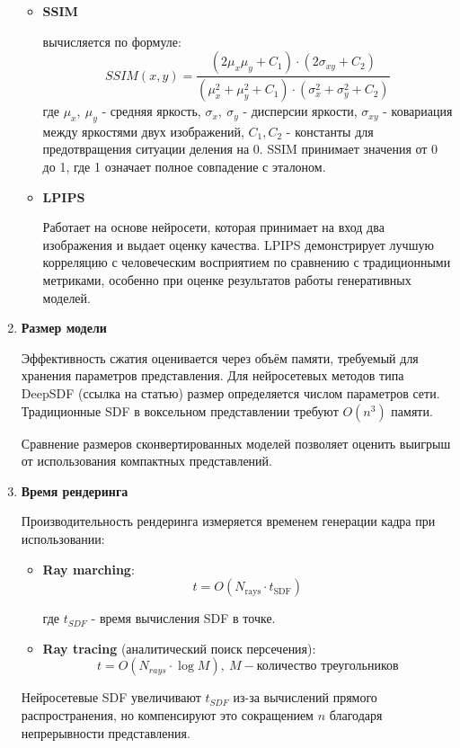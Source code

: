 \documentclass[a4paper,hidelinks,12pt]{article}
\begin{document}
\begin{enumerate}
\begin{itemize}
		\item \textbf{SSIM}
		\par
		вычисляется по формуле: $$SSIM(x, y) = \frac{(2\mu_x\mu_y + C_1) \cdot (2\sigma_{xy} + C_2)}{(\mu_x^2 + \mu_y^2 + C_1) \cdot (\sigma_x^2 + \sigma_y^2 + C_2)}$$
		где $\mu_x, \ \mu_y$ - средняя яркость, $\sigma_x, \ \sigma_y$ - дисперсии яркости, $\sigma_{xy}$ - ковариация между яркостями двух изображений, $C_1, C_2$ - константы для предотвращения ситуации деления на 0.
		SSIM принимает значения от 0 до 1, где 1 означает полное совпадение с эталоном.
		\item \textbf{LPIPS}
		\par
		Работает на основе нейросети, которая принимает на вход два изображения и выдает оценку качества. LPIPS демонстрирует лучшую корреляцию с человеческим восприятием по сравнению с традиционными 
		метриками, особенно при оценке результатов работы генеративных моделей.

	\end{itemize}

	\item \textbf{Размер модели}
	\par
	Эффективность сжатия оценивается через объём памяти, требуемый для хранения параметров представления. 
	Для нейросетевых методов типа DeepSDF (ссылка на статью) размер определяется числом параметров сети. Традиционные SDF в воксельном представлении требуют 
	$ O(n^3) $ памяти.

	Сравнение размеров сконвертированных моделей позволяет оценить выигрыш от использования компактных 
	представлений.

	\item \textbf{Время рендеринга}
	\par
	Производительность рендеринга измеряется временем генерации кадра при использовании:
	\begin{itemize}
		\item \textbf{Ray marching}:
		$$
		t = O(N_{\text{rays}} \cdot t_{\text{SDF}})
		$$

		где $ t_{SDF} $ - время вычисления SDF в точке.
		\item \textbf{Ray tracing} (аналитический поиск персечения):
		$$
		t = O(N_{rays} \cdot \log{M}), \ M - \text{количество треугольников}
		$$
	\end{itemize}

	Нейросетевые SDF увеличивают $ t_{SDF} $ из-за вычислений прямого распространения, 
	но компенсируют это сокращением $ n $ благодаря непрерывности представления. 


\end{enumerate}
\end{document}
